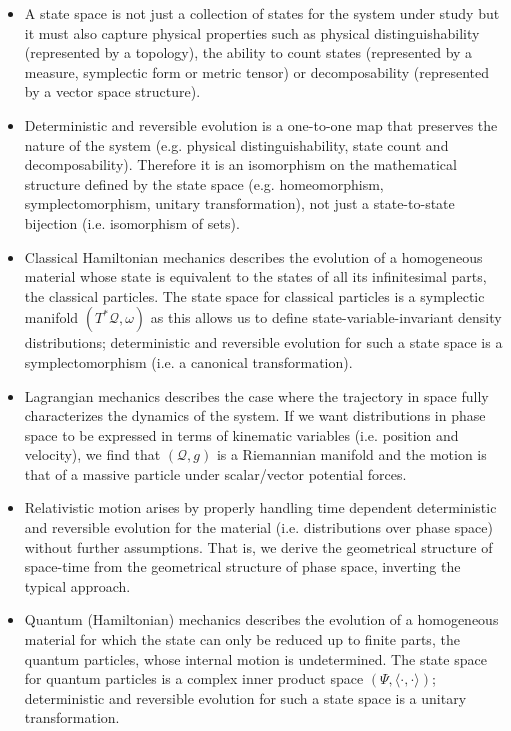 \documentclass[smallextended]{svjour3}
\numberwithin{equation}{section}
\theoremstyle{definition}
\begin{document}
\begin{itemize}

\item A state space is not just a collection of states for the system under study but it must also capture physical properties such as physical distinguishability (represented by a topology), the ability to count states (represented by a measure, symplectic form or metric tensor) or decomposability (represented by a vector space structure).

\item Deterministic and reversible evolution is a one-to-one map that preserves the nature of the system (e.g. physical distinguishability, state count and decomposability). Therefore it is an isomorphism on the mathematical structure defined by the state space (e.g. homeomorphism, symplectomorphism, unitary transformation), not just a state-to-state bijection (i.e. isomorphism of sets).

\item Classical Hamiltonian mechanics describes the evolution of a homogeneous material whose state is equivalent to the states of all its infinitesimal parts, the classical particles. The state space for classical particles is a symplectic manifold $(T^*\mathcal{Q}, \omega)$ as this allows us to define state-variable-invariant density distributions; deterministic and reversible evolution for such a state space is a symplectomorphism (i.e. a canonical transformation).

\item Lagrangian mechanics describes the case where the trajectory in space fully characterizes the dynamics of the system. If we want distributions in phase space to be expressed in terms of kinematic variables (i.e. position and velocity), we find that $(\mathcal{Q}, g)$ is a Riemannian manifold and the motion is that of a massive particle under scalar/vector potential forces.

\item Relativistic motion arises by properly handling time dependent deterministic and reversible evolution for the material (i.e. distributions over phase space) without further assumptions. That is, we derive the geometrical structure of space-time from the geometrical structure of phase space, inverting the typical approach.

\item Quantum (Hamiltonian) mechanics describes the evolution of a homogeneous material for which the state can only be reduced up to finite parts, the quantum particles, whose internal motion is undetermined. The state space for quantum particles is a complex inner product space $(\Psi, \langle \cdot , \cdot \rangle)$; deterministic and reversible evolution for such a state space is a unitary transformation.
\end{itemize}
\end{document}
